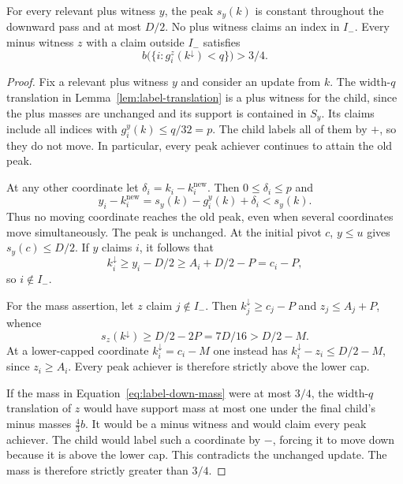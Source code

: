 \begin{lemma}
\label{lem:label-down}
For every relevant plus witness $y$, the peak $s_y(k)$ is constant
throughout the downward pass and at most $D/2$.  No plus witness
claims an index in $I_-$.  Every minus witness $z$ with a claim
outside $I_-$ satisfies
\begin{equation}
 b\bigl(\{i:g_i^z(k^{\downarrow})<q\}\bigr)>3/4.
 \label{eq:label-down-mass}
\end{equation}
\end{lemma}

\begin{proof}
Fix a relevant plus witness $y$ and consider an update from $k$.
The width-$q$ translation in Lemma~\ref{lem:label-translation}
is a plus witness for the child, since the plus masses are unchanged
and its support is contained in $S_y$.  Its claims include all
indices with $g_i^y(k)\le q/32=p$.  The child labels all of them
by $+$, so they do not move.  In particular, every peak achiever
continues to attain the old peak.

At any other coordinate let $\delta_i=k_i-k_i^{\mathrm{new}}$.
Then $0\le\delta_i\le p$ and
\[
 y_i-k_i^{\mathrm{new}}
   =s_y(k)-g_i^y(k)+\delta_i<s_y(k).
\]
Thus no moving coordinate reaches the old peak, even when several
coordinates move simultaneously.  The peak is unchanged.  At the
initial pivot $c$, $y\le u$ gives $s_y(c)\le D/2$.  If $y$
claims $i$, it follows that
\[
 k_i^{\downarrow}\ge y_i-D/2
    \ge A_i+D/2-P=c_i-P,
\]
so $i\notin I_-$.

For the mass assertion, let $z$ claim $j\notin I_-$.  Then
$k_j^{\downarrow}\ge c_j-P$ and $z_j\le A_j+P$, whence
\begin{equation}
 s_z(k^{\downarrow})\ge D/2-2P=7D/16>D/2-M.
 \label{eq:label-down-uncapped}
\end{equation}
At a lower-capped coordinate $k_i^{\downarrow}=c_i-M$ one instead
has $k_i^{\downarrow}-z_i\le D/2-M$, since $z_i\ge A_i$.
Every peak achiever is therefore strictly above the lower cap.

If the mass in Equation~\eqref{eq:label-down-mass} were at most
$3/4$, the width-$q$ translation of $z$ would have support mass
at most one under the final child's minus masses $\frac43 b$.
It would be a minus witness and would claim every peak achiever.
The child would label such a coordinate by $-$, forcing it to move
down because it is above the lower cap.  This contradicts the
unchanged update.  The mass is therefore strictly greater than
$3/4$.
\end{proof}

